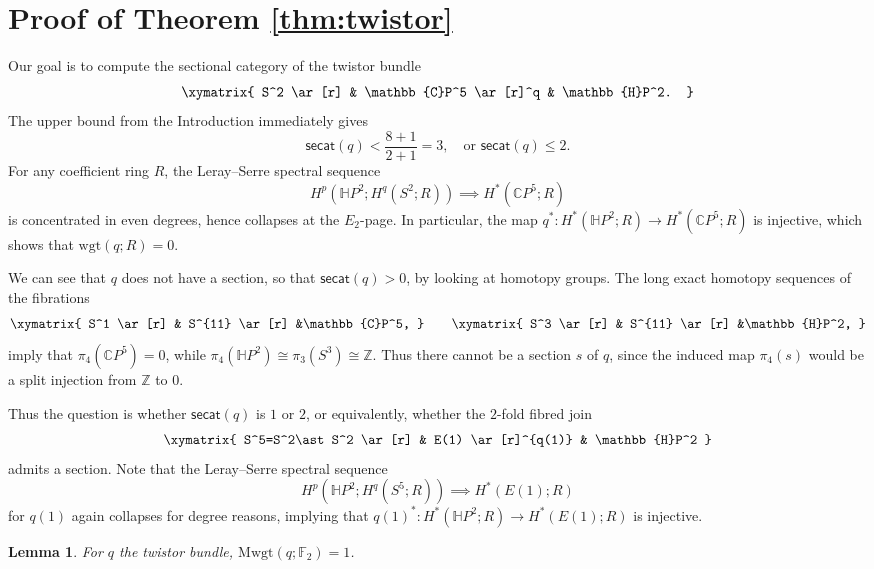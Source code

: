 \documentclass{amsart}
\theoremstyle{plain}
\newtheorem{lem}[thm]   {Lemma}
\theoremstyle{definition}
\def\secat{\mathsf{secat}}
\def\wgt{\mathrm{wgt}}
\newcommand{\Z}{\mathbb{Z}}
\newcommand{\C}{\mathbb{C}}
\newcommand{\Ha}{\mathbb{H}}
\newcommand{\F}{\mathbb{F}}
\def\Mwgt{\mathrm{Mwgt}}
\begin{document}
\section{Proof of Theorem \ref{thm:twistor}} 

Our goal is to compute the sectional category of the twistor bundle
\[
\xymatrix{
S^2 \ar[r] & \C P^5 \ar[r]^q & \Ha P^2.
}
\]
The upper bound from the Introduction immediately gives 
\[
\secat(q)< \frac{8+1}{2+1}=3,\quad\mbox{or }\secat(q)\le2.
\]
For any coefficient ring $R$, the Leray--Serre spectral sequence $$H^p(\Ha P^2; H^q(S^2;R))\implies H^*(\C P^5;R)$$ is concentrated in even degrees, hence collapses at the $E_2$-page. In particular, the map $q^*: H^*(\Ha P^2;R)\to H^*(\C P^5;R)$ is injective, which shows that $\wgt(q;R)=0$.

We can see that $q$ does not have a section, so that $\secat(q)>0$, by looking at homotopy groups. The long exact homotopy sequences of the fibrations
\[
\xymatrix{
S^1 \ar[r] & S^{11} \ar[r] &\C P^5,
}
\qquad 
\xymatrix{
S^3 \ar[r] & S^{11} \ar[r] &\Ha P^2,
}
\]
imply that $\pi_4(\C P^5)=0$, while $\pi_4(\Ha P^2)\cong \pi_3(S^3)\cong\Z$. Thus there cannot be a section $s$ of $q$, since the induced map $\pi_4(s)$ would be a split injection from $\Z$ to $0$.

Thus the question is whether $\secat(q)$ is $1$ or $2$, or equivalently, whether the $2$-fold fibred join
\[
\xymatrix{
S^5=S^2\ast S^2 \ar[r] & E(1) \ar[r]^{q(1)} & \Ha P^2
}
\]
admits a section. Note that the Leray--Serre spectral sequence $$H^p(\Ha P^2; H^q(S^5;R))\implies H^*(E(1);R)$$ for $q(1)$ again collapses for degree reasons, implying that $q(1)^*:H^*(\Ha P^2; R)\to H^*(E(1); R)$ is injective.

\begin{lem}\label{lem:Mwgttwistor}
For $q$ the twistor bundle, $\Mwgt(q;\F_2)=1$.
\end{lem}
\end{document}

